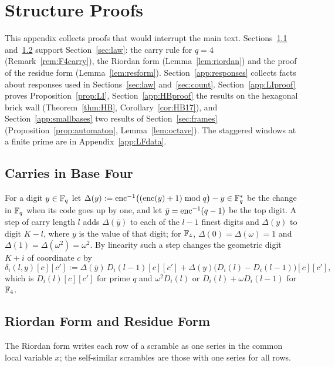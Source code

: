 %
\section{Structure Proofs}\label{app:machinery}
This appendix collects proofs that would interrupt the main text. Sections~\ref{app:F4carry} and~\ref{app:resform} support Section~\ref{sec:law}: the carry rule for $q=4$ (Remark~\ref{rem:F4carry}), the Riordan form (Lemma~\ref{lem:riordan}) and the proof of the residue form (Lemma~\ref{lem:resform}). Section~\ref{app:responses} collects facts about responses used in Sections~\ref{sec:law} and~\ref{sec:count}. Section~\ref{app:LIproof} proves Proposition~\ref{prop:LI}, Section~\ref{app:HBproof} the results on the hexagonal brick wall (Theorem~\ref{thm:HB}, Corollary~\ref{cor:HB17}), and Section~\ref{app:smallbases} two results of Section~\ref{sec:frames} (Proposition~\ref{prop:automaton}, Lemma~\ref{lem:octave}). The staggered windows at a finite prime are in Appendix~\ref{app:LFdata}.

\subsection{Carries in Base Four}\label{app:F4carry}
\begin{remark}[Carries for $q=4$]\label{rem:F4carry}
For a digit $y\in\mathbb{F}_q$ let $\Delta(y):=\operatorname{enc}^{-1}\bigl((\operatorname{enc}(y)+1)\bmod q\bigr)-y\in\mathbb{F}_q^*$ be the change in $\mathbb{F}_q$ when its code goes up by one, and let $\bar y=\operatorname{enc}^{-1}(q-1)$ be the top digit. A step of carry length $l$ adds $\Delta(\bar y)$ to each of the $l-1$ finest digits and $\Delta(y)$ to digit $K-l$, where $y$ is the value of that digit; for $\mathbb{F}_4$, $\Delta(0)=\Delta(\omega)=1$ and $\Delta(1)=\Delta(\omega^2)=\omega^2$. By linearity such a step changes the geometric digit $K+i$ of coordinate $c$ by
\begin{equation}\label{eq:carrychange}
\delta_i(l,y)[c][c']:=\Delta(\bar y)\,D_i(l-1)[c][c']+\Delta(y)\bigl(D_i(l)-D_i(l-1)\bigr)[c][c'],
\end{equation}
which is $D_i(l)[c][c']$ for prime $q$ and $\omega^2D_i(l)$ or $D_i(l)+\omega D_i(l-1)$ for $\mathbb{F}_4$.
\end{remark}

\subsection{Riordan Form and Residue Form}\label{app:resform}
The Riordan form writes each row of a scramble as one series in the common local variable $x$; the self-similar scrambles are those with one series for all rows.


